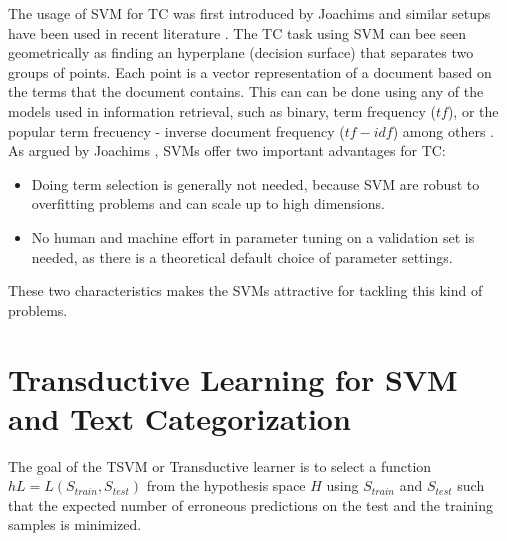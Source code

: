 The usage of SVM for TC  was first introduced by Joachims \cite{Joachims98,Joachims99c}
and similar setups have been used in recent literature \cite{DumaisPHS98}.
The TC task using SVM can bee seen geometrically as finding an hyperplane
(decision surface) that separates two groups of points. Each point
is a vector representation of a document based on the terms that the document
contains. This can can be done using any of the models used in information
retrieval, such as binary, term frequency ($tf$), or  the popular term
frecuency - inverse document frequency ($tf-idf$) among others \cite{Sebastiani02,866292}.
As argued by Joachims \cite{Joachims98}, SVMs offer two important
advantages for TC:

\begin{itemize}
\item Doing term selection is generally not needed, because SVM are robust
to overfitting problems and can scale up to high dimensions.
\item No human and machine effort in parameter tuning on a validation set
is needed, as there is a theoretical default choice of parameter settings.
\end{itemize}
These two characteristics makes the SVMs attractive for tackling this
kind of problems. 

\section{Transductive Learning for SVM and Text Categorization\label{sub:Transductive-Learning-for}}


The goal of the TSVM or Transductive learner is to select a function
$hL=L(S_{train},S_{test})$ from the hypothesis space $H$ using $S_{train}$
and $S_{test}$ such that the expected number of erroneous predictions
on the test and the training samples is minimized. 

